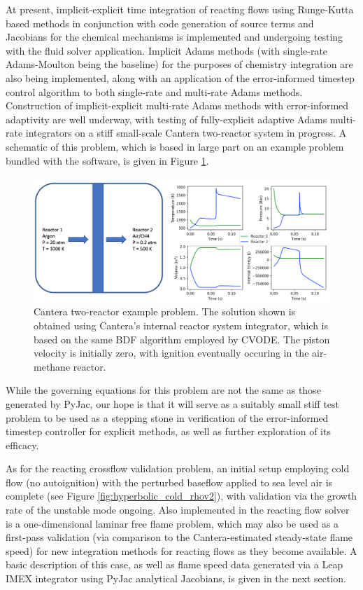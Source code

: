 At present, implicit-explicit time integration of reacting flows using Runge-Kutta
based methods in conjunction with code generation of source terms and Jacobians for
the chemical mechanisms is implemented and undergoing testing with the fluid solver
application. Implicit Adams methods (with single-rate Adams-Moulton being the baseline)
for the purposes of chemistry integration are also being implemented, along with
an application of the error-informed timestep control algorithm to both
single-rate and multi-rate Adams methods. Construction of implicit-explicit multi-rate
Adams methods with error-informed adaptivity are well underway, with testing
of fully-explicit adaptive Adams multi-rate integrators on a stiff small-scale Cantera
\cite{cantera} two-reactor system in progress. A schematic of this problem, which is
based in large part on an example problem bundled with the software, is given in
Figure \ref{fig:cantera_reactors}.
\begin{figure}
\centering
\includegraphics[width=0.8\linewidth,trim=4 4 4 4,clip]{figures/cantera_reactors_soln.png}
\caption{Cantera two-reactor example problem. The solution shown is obtained using
	 Cantera's internal reactor system integrator, which is based on the same
	 BDF algorithm employed by CVODE. The piston velocity is initially zero,
	 with ignition eventually occuring in the air-methane reactor.}
\label{fig:cantera_reactors}
\end{figure}
While the governing equations for this problem are not the same as those generated
by PyJac, our hope is that it will serve as a suitably small stiff test problem to be
used as a stepping stone in verification of the error-informed timestep controller
for explicit methods, as well as further exploration of its efficacy.

As for the reacting crossflow validation problem, an initial setup employing
cold flow (no autoignition) with the perturbed baseflow applied to sea level air
is complete (see Figure \ref{fig:hyperbolic_cold_rhov2}), with validation via the
growth rate of the unstable mode ongoing. Also implemented in the reacting flow
solver is a one-dimensional laminar free flame problem, which may also be used
as a first-pass validation (via comparison to the Cantera-estimated steady-state
flame speed) for new integration methods for reacting flows as they become available.
A basic description of this case, as well as flame speed data generated via a Leap
IMEX integrator using PyJac analytical Jacobians, is given in the next section.


